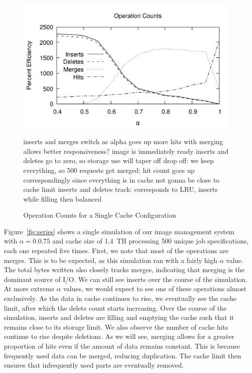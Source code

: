 \documentclass[sigconf]{acmart}
\begin{document}
\begin{figure}
\includegraphics[width=\linewidth]{curated/comparative/operation_count.pdf}
\caption{Operation Counts for a Single Cache Configuration}
\label{fig:opcounts}
inserts and merges switch as alpha goes up
more hits with merging
allows better responsiveness? image is immediately ready
inserts and deletes go to zero, so storage use will taper off
drop off: we keep everything, so 500 requests get merged; hit count goes up correspondingly since everything is in cache
not gonna be close to cache limit
inserts and deletes track: corresponds to LRU, inserts while filling then balanced
\fi
\end{figure}
    
    Figure~\ref{fig:series} shows a single simulation of our image management system
with $\alpha=0.0.75$ and cache size of 1.4~TB processing 500 unique job specifications, each one repeated five times.
First, we note that most of the operations are merges.
This is to be expected,
as this simulation ran with a fairly high $\alpha$ value.
The total bytes written also closely tracks merges,
indicating that merging is the dominant source of I/O.
We can still see inserts over the course of the simulation.
At more extreme $\alpha$ values,
we would expect to see one of these operations almost exclusively.
As the data in cache continues to rise,
we eventually see the cache limit,
after which the delete count starts increasing.
Over the course of the simulation,
inserts and deletes are filling and emptying the cache such that it remains close to its storage limit.
We also observe the number of cache hits continue to rise despite deletions.
As we will see, merging allows for a greater proportion of hits even if the amount of data remains constant.
This is because frequently used data can be merged,
reducing duplication.
The cache limit then ensures that infrequently used parts are eventually removed.
\end{document}

